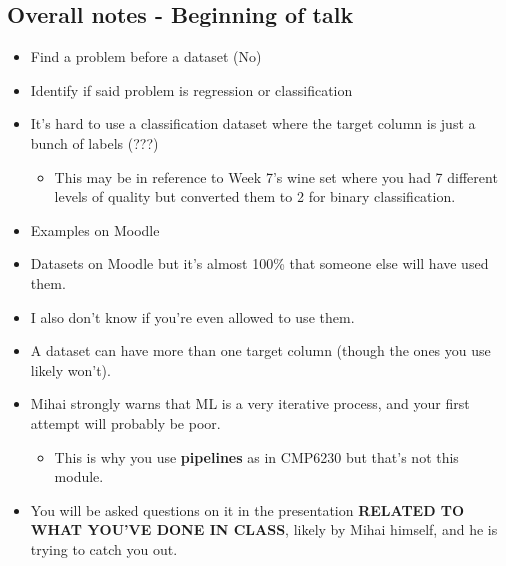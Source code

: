 \documentclass[12pt]{report}
\begin{document}
\subsection{Overall notes - Beginning of talk}
\begin{itemize}
    \item Find a problem before a dataset (No)
    \item Identify if said problem is regression or classification
    \item It's hard to use a classification dataset where the target column is just a bunch of labels (???)
    \begin{itemize}
        \item This may be in reference to Week 7's wine set where you had 7 different levels of quality but converted them to 2 for binary classification.
    \end{itemize}
    \item Examples on Moodle
    \item Datasets on Moodle but it's almost 100\% that someone else will have used them.
    \item I also don't know if you're even allowed to use them.
    \item A dataset can have more than one target column (though the ones you use likely won't).
    \item Mihai strongly warns that ML is a very iterative process, and your first attempt will probably be poor. \begin{itemize}
        \item This is why you use \textbf{pipelines} as in CMP6230 but that's not this module.
    \end{itemize}
    \item You will be asked questions on it in the presentation \textbf{RELATED TO WHAT YOU'VE DONE IN CLASS}, likely
    by Mihai himself, and he is trying to catch you out.
\end{itemize}
\end{document}
